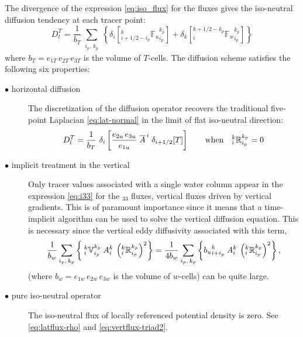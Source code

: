 \documentclass[../tex_main/NEMO_manual]{subfiles}
\begin{document}
The divergence of the expression \autoref{eq:iso_flux} for the fluxes gives the iso-neutral diffusion tendency at
each tracer point:
\begin{equation} \label{eq:iso_operator} D_l^T = \frac{1}{b_T}
  \sum_{\substack{i_p,\,k_p}} \left\{ \delta_{i} \left[{_{i+1/2-i_p}^k
        {\mathbb{F}_u }_{i_p}^{k_p}} \right] + \delta_{k} \left[
      {_i^{k+1/2-k_p} {\mathbb{F}_w}_{i_p}^{k_p}} \right] \right\}
\end{equation}
where $b_T= e_{1T}\,e_{2T}\,e_{3T}$ is the volume of $T$-cells.
The diffusion scheme satisfies the following six properties:
\begin{description}
\item[$\bullet$ horizontal diffusion]
  The discretization of the diffusion operator recovers the traditional five-point Laplacian
  \autoref{eq:lat-normal} in the limit of flat iso-neutral direction:
  \begin{equation} \label{eq:iso_property0} D_l^T = \frac{1}{b_T} \
    \delta_{i} \left[ \frac{e_{2u}\,e_{3u}}{e_{1u}} \;
      \overline{{A}}^{\,i} \; \delta_{i+1/2}[T] \right] \qquad
    \text{when} \quad { _i^k \mathbb{R}_{i_p}^{k_p} }=0
  \end{equation}

\item[$\bullet$ implicit treatment in the vertical]
  Only tracer values associated with a single water column appear in the expression \autoref{eq:i33} for
  the $_{33}$ fluxes, vertical fluxes driven by vertical gradients.
  This is of paramount importance since it means that a time-implicit algorithm can be used to
  solve the vertical diffusion equation.
  This is necessary since the vertical eddy diffusivity associated with this term,
  \begin{equation}
    \frac{1}{b_w}\sum_{\substack{i_p, \,k_p}} \left\{
      {\:}_i^k\mathbb{V}_{i_p}^{k_p} \: {A}_i^k \: \left(_i^k \mathbb{R}_{i_p}^{k_p}\right)^2
    \right\}  =
    \frac{1}{4b_w}\sum_{\substack{i_p, \,k_p}} \left\{
      {b_u}_{i+i_p}^k\: {A}_i^k \: \left(_i^k \mathbb{R}_{i_p}^{k_p}\right)^2
    \right\},
  \end{equation}
  (where $b_w= e_{1w}\,e_{2w}\,e_{3w}$ is the volume of $w$-cells) can be quite large.

\item[$\bullet$ pure iso-neutral operator]
  The iso-neutral flux of locally referenced potential density is zero.
  See \autoref{eq:latflux-rho} and \autoref{eq:vertflux-triad2}.


\end{description}
\end{document}
